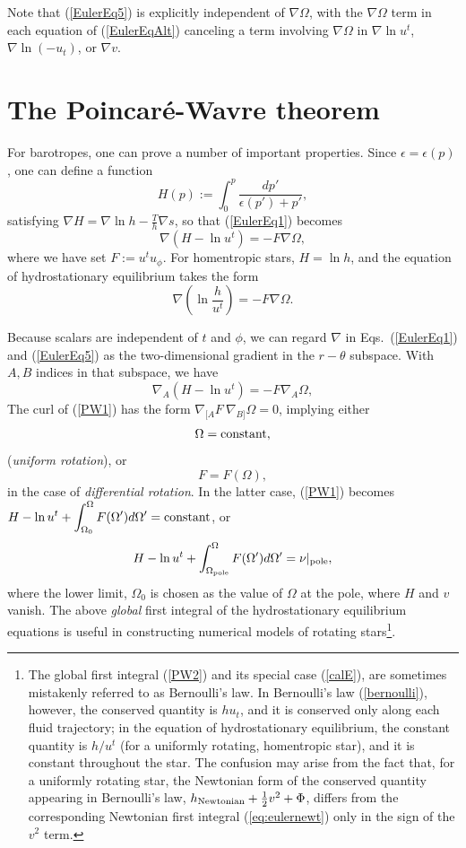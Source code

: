 \documentclass[12pt]{article}
\def\be{\begin{equation}}
\def\ee{\end{equation}}
\newcommand{\dis}{\displaystyle}
\begin{document}
Note that (\ref{EulerEq5}) is explicitly independent 
of $\nabla \Omega$, with the $\nabla \Omega$ term in each equation of (\ref{EulerEqAlt}) canceling a term involving $\nabla \Omega$ in $\nabla \ln u^t$, 
$\nabla\ln(-u_t)$, or $\nabla v$.

\section{The Poincar\'e-Wavre theorem}
\label{sec:poincare-wavre}

For barotropes,
one can prove a number of important properties. Since 
$\epsilon=\epsilon(p)$, one can define a function
\be
H(p) := \int_0^p \frac{dp'}{\epsilon(p')+p'},
\ee
satisfying $\nabla H = \nabla \ln h - \frac{T}{h} \nabla s$, 
so that (\ref{EulerEq1}) becomes
\be
\nabla (H-\ln u^t) = -F \nabla  \Omega,
\label{PW0}
\ee
where we have set $F:=u^t u_\phi$. For homentropic stars, $H=\ln h$, and 
the equation of hydrostationary equilibrium takes the form 
\be
\nabla \left(\ln \frac h{u^t} \right) = -F \nabla  \Omega.
\label{eq:hequil}
\ee

Because scalars are independent of $t$ and $\phi$, we can regard $\nabla$ in 
Eqs.~(\ref{EulerEq1}) and (\ref{EulerEq5}) as the two-dimensional gradient in 
the $r-\theta$ subspace. With $A,B$ indices in that subspace, we have 
\be
\nabla_A (H-\ln u^t) = -F \nabla_A \Omega,
\label{PW1}
\ee
The curl of (\ref{PW1}) has the form
 $\nabla_{[A}F\ \nabla_{B]}\Omega=0$, implying either 
\be
\Omega={\rm constant},
\ee
({\it uniform rotation}), or 
\be
F=F(\Omega),
\label{Fomega}
\ee
in the case of {\it differential rotation}. In the latter case, (\ref{PW1})
becomes\\
$\dis H-\ln u^t+\int^\Omega_{\Omega_0} F(\Omega')d\Omega' ={\rm constant}$, 
or 
\be
H-\ln u^t+\int^\Omega_{\Omega_{\rm pole}} F(\Omega')d\Omega' =\nu|_{\rm pole},
\label{PW2}
\ee
where the lower limit, $\Omega_0$ is chosen as the value of $\Omega$ at the pole, 
where $H$ and $v$ vanish.  The above {\it global} first integral of the hydrostationary equilibrium 
equations is useful in constructing numerical models of rotating stars\footnote{The
global first integral (\ref{PW2}) and its special case (\ref{calE}), are 
sometimes mistakenly referred to as Bernoulli's law. In Bernoulli's law 
(\ref{bernoulli}), however, the conserved quantity is $hu_t$, and it is 
conserved only along each fluid trajectory; in the equation of hydrostationary 
equilibrium, the constant quantity is $h/u^t$ (for a uniformly rotating, homentropic star), 
and it is constant throughout the star. The confusion may arise from the 
fact that, for a uniformly rotating star, the Newtonian form of the conserved 
quantity appearing in Bernoulli's law, $h_{\rm Newtonian} +\frac12 v^2 +\Phi$, 
differs from the corresponding Newtonian first integral (\ref{eq:eulernewt}) 
only in the sign of the 
$\dis v^2$ term.}.
\end{document}
